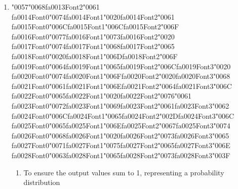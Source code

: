 \documentclass[12pt]{article}
\begin{document}
\begin{enumerate}[label=Q\arabic*.]
\begin{enumerate}[label=(\Alph*)]
\end{enumerate}
\item {\char"0057}{\char"0068}{\csname fa0013Font2\endcsname\char"0061} {\csname fa0014Font0\endcsname\char"0074}{\csname fa0014Font1\endcsname\char"0020}{\csname fa0014Font2\endcsname\char"0061} {\csname fa0015Font0\endcsname\char"006C}{\csname fa0015Font1\endcsname\char"006C}{\csname fa0015Font2\endcsname\char"006F} {\csname fa0016Font0\endcsname\char"0077}{\csname fa0016Font1\endcsname\char"0073}{\csname fa0016Font2\endcsname\char"0020} {\csname fa0017Font0\endcsname\char"0074}{\csname fa0017Font1\endcsname\char"0068}{\csname fa0017Font2\endcsname\char"0065} {\csname fa0018Font0\endcsname\char"0020}{\csname fa0018Font1\endcsname\char"006D}{\csname fa0018Font2\endcsname\char"006F} {\csname fa0019Font0\endcsname\char"0064}{\csname fa0019Font1\endcsname\char"0065}{\csname fa0019Font2\endcsname\char"006C}{\csname fa0019Font3\endcsname\char"0020} {\csname fa0020Font0\endcsname\char"0074}{\csname fa0020Font1\endcsname\char"006F}{\csname fa0020Font2\endcsname\char"0020}{\csname fa0020Font3\endcsname\char"0068} {\csname fa0021Font0\endcsname\char"0061}{\csname fa0021Font1\endcsname\char"006E}{\csname fa0021Font2\endcsname\char"0064}{\csname fa0021Font3\endcsname\char"006C} {\csname fa0022Font0\endcsname\char"0065}{\csname fa0022Font1\endcsname\char"0020}{\csname fa0022Font2\endcsname\char"0076}{\char"0061} {\csname fa0023Font0\endcsname\char"0072}{\csname fa0023Font1\endcsname\char"0069}{\csname fa0023Font2\endcsname\char"0061}{\csname fa0023Font3\endcsname\char"0062} {\csname fa0024Font0\endcsname\char"006C}{\csname fa0024Font1\endcsname\char"0065}{\csname fa0024Font2\endcsname\char"002D}{\csname fa0024Font3\endcsname\char"006C} {\csname fa0025Font0\endcsname\char"0065}{\csname fa0025Font1\endcsname\char"006E}{\csname fa0025Font2\endcsname\char"0067}{\csname fa0025Font3\endcsname\char"0074} {\csname fa0026Font0\endcsname\char"0068}{\csname fa0026Font1\endcsname\char"0020}{\csname fa0026Font2\endcsname\char"0073}{\csname fa0026Font3\endcsname\char"0065} {\csname fa0027Font0\endcsname\char"0071}{\csname fa0027Font1\endcsname\char"0075}{\csname fa0027Font2\endcsname\char"0065}{\csname fa0027Font3\endcsname\char"006E} {\csname fa0028Font0\endcsname\char"0063}{\csname fa0028Font1\endcsname\char"0065}{\csname fa0028Font2\endcsname\char"0073}{\csname fa0028Font3\endcsname\char"003F}
\begin{enumerate}[label=(\Alph*)]
    \item To ensure the output values sum to 1, representing a probability distribution

\end{enumerate}
\end{enumerate}
\end{document}
